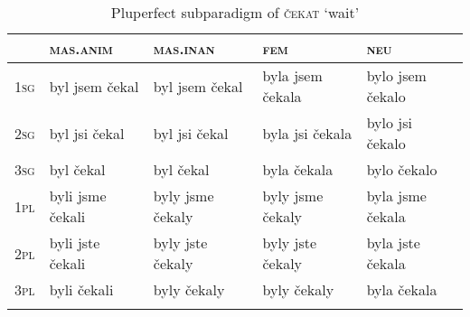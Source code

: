 \documentclass[output=paper]{langsci/langscibook}
\begin{document}
\begin{table}
\caption{Past conditional subparadigm of \textsc{\v{c}ekat} ‘wait’ \label{tab:pst:cond}}
\end{table}

\begin{table}
\small
\begin{tabular}{lllll}
\lsptoprule
& \scshape mas.anim & \scshape mas.inan & \scshape fem & \scshape neu\\
\midrule
\scshape 1sg & byl jsem \v{c}ekal& byl jsem \v{c}ekal&  byla jsem \v{c}ekala&  bylo jsem \v{c}ekalo\\ 
\scshape 2sg & byl jsi \v{c}ekal& byl jsi \v{c}ekal&  byla jsi \v{c}ekala&  bylo jsi \v{c}ekalo\\ 
\scshape 3sg &  byl  \v{c}ekal&  byl  \v{c}ekal&  byla  \v{c}ekala&  bylo  \v{c}ekalo\\ 
\scshape 1pl & byli jsme \v{c}ekali& byly jsme \v{c}ekaly&  byly jsme \v{c}ekaly&  byla jsme \v{c}ekala\\
\scshape 2pl &  byli jste \v{c}ekali&  byly jste \v{c}ekaly&  byly jste \v{c}ekaly&  byla jste \v{c}ekala\\
\scshape 3pl &  byli  \v{c}ekali&  byly  \v{c}ekaly&  byly  \v{c}ekaly&  byla  \v{c}ekala\\
\lspbottomrule
\end{tabular}
\caption{Pluperfect subparadigm of \textsc{\v{c}ekat} ‘wait’ \label{tab:pluperfect}}
\end{table}
\end{document}
